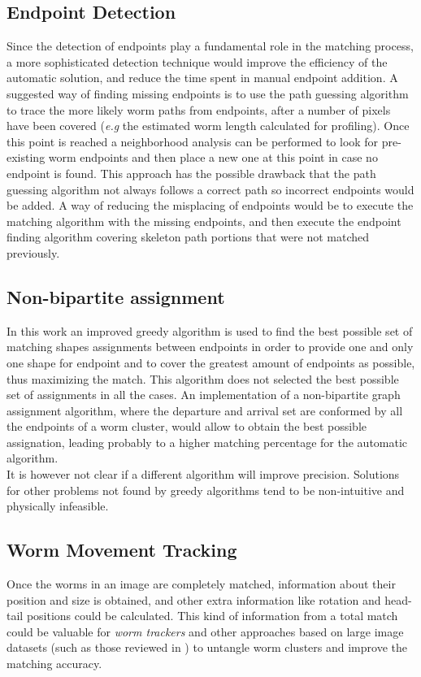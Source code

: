\subsection*{Endpoint Detection}
Since the detection of endpoints play a fundamental role in the matching 
process, a more sophisticated detection technique would improve the 
efficiency of the automatic solution, and reduce the time spent in
manual endpoint addition. A suggested way of finding missing endpoints is
to use the path guessing algorithm to trace the more likely worm paths 
from endpoints, after a number of pixels have been covered (\emph{e.g} the
estimated worm length calculated for profiling). Once this point is reached
a neighborhood analysis can be performed to look for pre-existing 
worm endpoints and then place a new one at this point in case no endpoint 
is found. This approach has the possible drawback that the path guessing
algorithm not always follows a correct path so incorrect endpoints would
be added. A way of reducing the misplacing of endpoints would be to execute
the matching algorithm with the missing endpoints, and then execute the 
endpoint finding algorithm covering skeleton path portions that were not 
matched previously.

\subsection*{Non-bipartite assignment}
In this work an improved greedy algorithm is used to find the best
possible set of matching shapes assignments between endpoints in order
to provide one and only one shape for endpoint and to cover the greatest
amount of endpoints as possible, thus maximizing the match. This algorithm
does not selected the best possible set of assignments in all the cases. 
An implementation of a non-bipartite graph assignment algorithm, where
the departure and arrival set are conformed by all the endpoints of a worm
cluster, would allow to obtain the best possible assignation, leading
probably to a higher matching percentage for the automatic algorithm.\\

It is however not clear if a different algorithm will improve precision.
Solutions for other problems not found by greedy algorithms tend to be
non-intuitive and physically infeasible.


\subsection*{Worm Movement Tracking}
Once the worms in an image are completely matched, information about their
position and size is obtained, and other extra information like rotation
and head-tail positions could be calculated. This kind of information from a
total match could be valuable for \emph{worm trackers} and other approaches 
based on large image datasets
(such as those reviewed in \cite{automated}) to untangle worm clusters and 
improve the matching accuracy.
